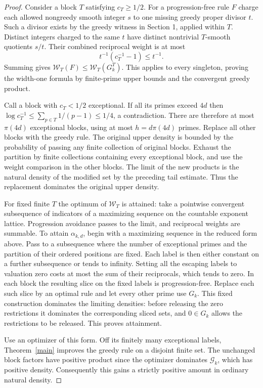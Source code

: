 \documentclass[11pt]{article}
\newcommand{\GP}{\mathcal G_k}
\newcommand{\weight}{\mathcal W}
\begin{document}
\begin{proof}
Consider a block $T$ satisfying $c_T\ge1/2$. For a progression-free rule $F$ charge each allowed nongreedy smooth integer $s$ to one missing greedy proper divisor $t$. Such a divisor exists by the greedy witness in Section 1, applied within $T$. Distinct integers charged to the same $t$ have distinct nontrivial $T$-smooth quotients $s/t$. Their combined reciprocal weight is at most
\[
                   t^{-1}(c_T^{-1}-1)\le t^{-1}.
\]
Summing gives $\weight_T(F)\le\weight_T(G_k^T)$. This applies to every singleton, proving the width-one formula by finite-prime upper bounds and the convergent greedy product.

Call a block with $c_T<1/2$ exceptional. If all its primes exceed $4d$ then $\log c_T^{-1}\le\sum_{p\in T}1/(p-1)\le1/4$, a contradiction. There are therefore at most $\pi(4d)$ exceptional blocks, using at most $h=d\pi(4d)$ primes. Replace all other blocks with the greedy rule. The original upper density is bounded by the probability of passing any finite collection of original blocks. Exhaust the partition by finite collections containing every exceptional block, and use the weight comparison in the other blocks. The limit of the new products is the natural density of the modified set by the preceding tail estimate. Thus the replacement dominates the original upper density.

For fixed finite $T$ the optimum of $\weight_T$ is attained: take a pointwise convergent subsequence of indicators of a maximizing sequence on the countable exponent lattice. Progression avoidance passes to the limit, and reciprocal weights are summable. To attain $\alpha_{k,d}$, begin with a maximizing sequence in the reduced form above. Pass to a subsequence where the number of exceptional primes and the partition of their ordered positions are fixed. Each label is then either constant on a further subsequence or tends to infinity. Setting all the escaping labels to valuation zero costs at most the sum of their reciprocals, which tends to zero. In each block the resulting slice on the fixed labels is progression-free. Replace each such slice by an optimal rule and let every other prime use $G_k$. This fixed construction dominates the limiting densities: before releasing the zero restrictions it dominates the corresponding sliced sets, and $0\in G_k$ allows the restrictions to be released. This proves attainment.

Use an optimizer of this form. Off its finitely many exceptional labels, Theorem~\ref{main} improves the greedy rule on a disjoint finite set. The unchanged block factors have positive product since the optimizer dominates $\GP$, which has positive density. Consequently this gains a strictly positive amount in ordinary natural density.


\end{proof}
\end{document}
